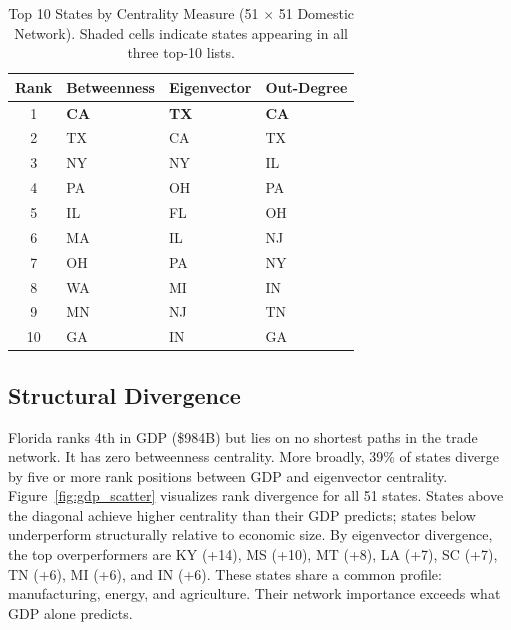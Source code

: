 \documentclass[12pt,oneside]{book}
\begin{document}
\begin{table}[ht]
    \centering
    \caption[Top 10 States by Centrality Measure (51 $\times$ 51 Domestic Network).]{Top 10 States by Centrality Measure (51 $\times$ 51 Domestic Network).
    Shaded cells indicate states appearing in all three top-10 lists.}
    \label{tab:top10}
    \begin{tabular}{clll}
    \hline
    \textbf{Rank} & \textbf{Betweenness} & \textbf{Eigenvector} & \textbf{Out-Degree} \\
    \hline
    1 & \textbf{\cellcolor{gray!15}CA} & \textbf{\cellcolor{gray!15}TX} & \textbf{\cellcolor{gray!15}CA} \\
    2 & \cellcolor{gray!15}TX & \cellcolor{gray!15}CA & \cellcolor{gray!15}TX \\
    3 & NY & NY & \cellcolor{gray!15}IL \\
    4 & \cellcolor{gray!15}PA & \cellcolor{gray!15}OH & \cellcolor{gray!15}PA \\
    5 & \cellcolor{gray!15}IL & FL & \cellcolor{gray!15}OH \\
    6 & MA & \cellcolor{gray!15}IL & NJ \\
    7 & \cellcolor{gray!15}OH & \cellcolor{gray!15}PA & NY \\
    8 & WA & MI & IN \\
    9 & MN & NJ & TN \\
    10 & \cellcolor{gray!15}GA & IN & \cellcolor{gray!15}GA \\
    \hline
    \end{tabular}
\end{table}

\clearpage
\subsection{Structural Divergence}

Florida ranks 4th in GDP (\$984B) but lies on no shortest paths in the trade network. It has zero betweenness centrality. More broadly, 39\% of states diverge by five or more rank positions between GDP and eigenvector centrality. Figure~\ref{fig:gdp_scatter} visualizes rank divergence for all 51 states. States above the diagonal achieve higher centrality than their GDP predicts; states below underperform structurally relative to economic size. By eigenvector divergence, the top overperformers are KY (+14), MS (+10), MT (+8), LA (+7), SC (+7), TN (+6), MI (+6), and IN (+6). These states share a common profile: manufacturing, energy, and agriculture. Their network importance exceeds what GDP alone predicts. 
\end{document}
